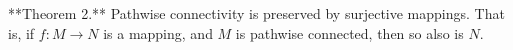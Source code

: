 **Theorem 2.** Pathwise connectivity is preserved by surjective mappings. That is, if $f: M \rightarrow N$ is a mapping, and $M$ is pathwise connected, then so also is $N$.
